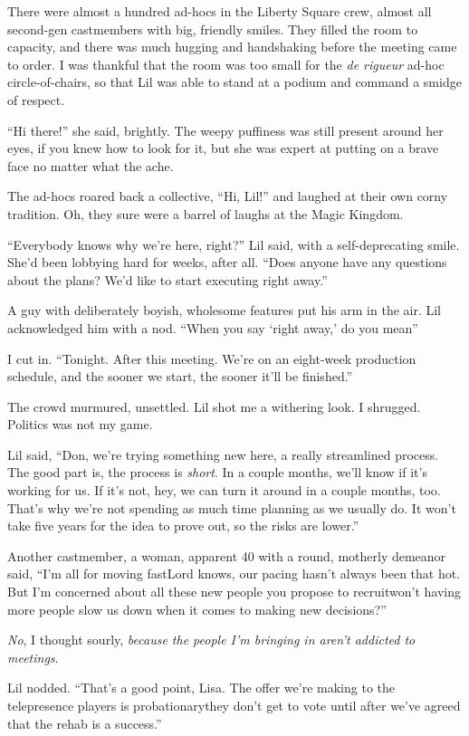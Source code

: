There were almost a hundred ad-hocs in the Liberty Square crew,
almost all second-gen castmembers with big, friendly smiles. They
filled the room to capacity, and there was much hugging and
handshaking before the meeting came to order. I was thankful that
the room was too small for the \emph{de rigueur} ad-hoc
circle-of-chairs, so that Lil was able to stand at a podium and
command a smidge of respect.

“Hi there!” she said, brightly. The weepy puffiness was still
present around her eyes, if you knew how to look for it, but she
was expert at putting on a brave face no matter what the ache.

The ad-hocs roared back a collective, “Hi, Lil!” and laughed at
their own corny tradition. Oh, they sure were a barrel of laughs at
the Magic Kingdom.

“Everybody knows why we're here, right?” Lil said, with a
self-deprecating smile. She'd been lobbying hard for weeks, after
all. “Does anyone have any questions about the plans? We'd like to
start executing right away.”

A guy with deliberately boyish, wholesome features put his arm in
the air. Lil acknowledged him with a nod. “When you say ‘right
away,’ do you mean{\dash}”

I cut in. “Tonight. After this meeting. We're on an eight-week
production schedule, and the sooner we start, the sooner it'll be
finished.”

The crowd murmured, unsettled. Lil shot me a withering look. I
shrugged. Politics was not my game.

Lil said, “Don, we're trying something new here, a really
streamlined process. The good part is, the process is \emph{short}.
In a couple months, we'll know if it's working for us. If it's not,
hey, we can turn it around in a couple months, too. That's why
we're not spending as much time planning as we usually do. It won't
take five years for the idea to prove out, so the risks are
lower.”

Another castmember, a woman, apparent 40 with a round, motherly
demeanor said, “I'm all for moving fast{\dash}Lord knows, our pacing
hasn't always been that hot. But I'm concerned about all these new
people you propose to recruit{\dash}won't having more people slow us down
when it comes to making new decisions?”

\emph{No}, I thought sourly,
\emph{because the people I'm bringing in aren't addicted to meetings}.

Lil nodded. “That's a good point, Lisa. The offer we're making to
the telepresence players is probationary{\dash}they don't get to vote
until after we've agreed that the rehab is a success.”


